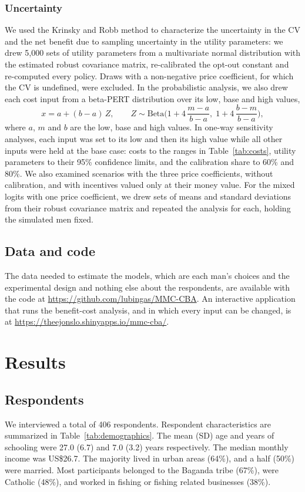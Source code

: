 \documentclass[11pt]{article}
\numberwithin{equation}{section}\numberwithin{figure}{section}\numberwithin{table}{section}
\begin{document}
\subsubsection{Uncertainty}
We used the Krinsky and Robb method\cite{KrinskyRobb1986} to characterize the uncertainty in the CV and the net benefit due to sampling uncertainty in the utility parameters: we drew 5,000 sets of utility parameters from a multivariate normal distribution with the estimated robust covariance matrix, re-calibrated the opt-out constant and re-computed every policy. Draws with a non-negative price coefficient, for which the CV is undefined, were excluded. In the probabilistic analysis, we also drew each cost input from a beta-PERT distribution over its low, base and high values,
\begin{equation}
x = a + (b - a)\,Z, \qquad Z \sim \text{Beta}\Big(1 + 4\,\frac{m - a}{b - a},\; 1 + 4\,\frac{b - m}{b - a}\Big),
\end{equation}
where $a$, $m$ and $b$ are the low, base and high values. In one-way sensitivity analyses, each input was set to its low and then its high value while all other inputs were held at the base case: costs to the ranges in Table~\ref{tab:costs}, utility parameters to their 95\% confidence limits, and the calibration share to 60\% and 80\%. We also examined scenarios with the three price coefficients, without calibration, and with incentives valued only at their money value. For the mixed logits with one price coefficient, we drew \mmcMXkr{} sets of means and standard deviations from their robust covariance matrix and repeated the analysis for each, holding the simulated men fixed.

\subsection{Data and code}
The data needed to estimate the models, which are each man's choices and the experimental design and nothing else about the respondents, are available with the code at \url{https://github.com/lubingas/MMC-CBA}. An interactive application that runs the benefit-cost analysis, and in which every input can be changed, is at \url{https://theejonslo.shinyapps.io/mmc-cba/}.


\section{Results}
\subsection{Respondents}
We interviewed a total of 406 respondents. Respondent characteristics are summarized in Table~\ref{tab:demographics}. The mean (SD) age and years of schooling were 27.0 (6.7) and 7.0 (3.2) years respectively. The median monthly income was US\$26.7. The majority lived in urban areas (64\%), and a half (50\%) were married. Most participants belonged to the Baganda tribe (67\%), were Catholic (48\%), and worked in fishing or fishing related businesses (38\%).
\end{document}
